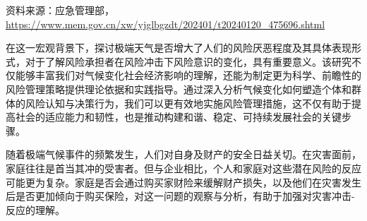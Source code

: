 \begin{table}[h]
{\begin{tabular}{ccccc}
            \bottomrule
        \end{tabular}}
    \par\qquad {} 资料来源：应急管理部，\url{https://www.mem.gov.cn/xw/yjglbgzdt/202401/t20240120_475696.shtml}
\end{table}

在这一宏观背景下，探讨极端天气是否增大了人们的风险厌恶程度及其具体表现形式，对于了解风险承担者在风险冲击下风险意识的变化，具有重要意义。该研究不仅能够丰富我们对气候变化社会经济影响的理解，还能为制定更为科学、前瞻性的风险管理策略提供理论依据和实践指导。通过深入分析气候变化如何塑造个体和群体的风险认知与决策行为，我们可以更有效地实施风险管理措施，这不仅有助于提高社会的适应能力和韧性，也是推动构建和谐、稳定、可持续发展社会的关键步骤。

随着极端气候事件的频繁发生，人们对自身及财产的安全日益关切。在灾害面前，家庭往往是首当其冲的受害者。但与企业相比，个人和家庭对这些潜在风险的反应可能更为复杂。家庭是否会通过购买家财险来缓解财产损失，以及他们在灾害发生后是否更加倾向于购买保险，对这一问题的观察与分析，有助于加强对灾害冲击-反应的理解。

